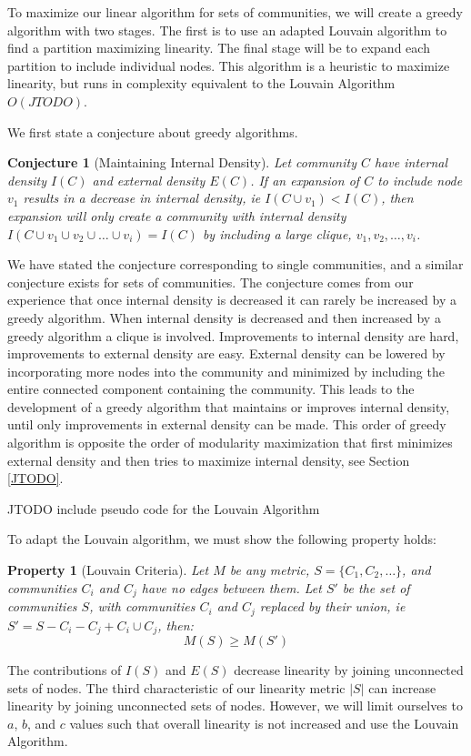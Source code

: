 \documentclass[phd,tocprelim]{cornell}
\newtheorem{conjecture}[definition]{Conjecture}
\newtheorem{property}[definition]{Property}
\begin{document}
To maximize our linear algorithm for sets of communities, we will create a greedy algorithm with two stages.  The first is to use an adapted Louvain algorithm \cite{blondel} to find a partition maximizing linearity.  The final stage will be to expand each partition to include individual nodes.  This algorithm is a heuristic to maximize linearity, but runs in complexity equivalent to the Louvain Algorithm $O(JTODO)$.

We first state a conjecture about greedy algorithms.
\begin{conjecture}[Maintaining Internal Density]
Let community $C$ have internal density $I(C)$ and external density $E(C)$.  If an expansion of $C$ to include node $v_1$ results in a decrease in internal density, ie $I(C \cup v_1) < I(C)$, then expansion will only create a community with internal density $I(C \cup v_1 \cup v_2 \cup \dots \cup v_i) = I(C)$ by including a large clique, $v_1, v_2, \dots, v_i$.
\label{conj:int_density}
\end{conjecture}
We have stated the conjecture corresponding to single communities, and a similar conjecture exists for sets of communities.  The conjecture comes from our experience that once internal density is decreased it can rarely be increased by a greedy algorithm.  When internal density is decreased and then increased by a greedy algorithm a clique is involved.  Improvements to internal density are hard, improvements to external density are easy.  External density can be lowered by incorporating more nodes into the community and minimized by including the entire connected component containing the community. This leads to the development of a greedy algorithm that maintains or improves internal density, until only improvements in external density can be made.  This order of greedy algorithm is opposite the order of modularity maximization that first minimizes external density and then tries to maximize internal density, see Section \ref{JTODO}.

JTODO include pseudo code for the Louvain Algorithm

To adapt the Louvain algorithm, we must show the following property holds:
\begin{property}[Louvain Criteria]
Let $M$ be any metric, $S = \{C_1, C_2, \dots \}$, and communities $C_i$ and $C_j$ have no edges between them.  Let $S'$ be the set of communities $S$, with communities $C_i$ and $C_j$ replaced by their union, ie $S' = S - C_i - C_j + C_i \cup C_j$, then:
\begin{equation}
M(S) \geq M(S')
\end{equation}
\end{property}
The contributions of $I(S)$ and $E(S)$ decrease linearity by joining unconnected sets of nodes.  The third characteristic of our linearity metric $|S|$ can increase linearity by joining unconnected sets of nodes.  However, we will limit ourselves to $a$, $b$, and $c$ values such that overall linearity is not increased and use the Louvain Algorithm.
\end{document}

